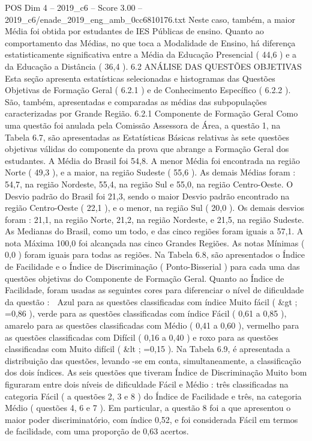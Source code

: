 \begin{textsample}{POS Dim 4 – 2019\_c6 – Score 3.00 – 2019\_c6/enade\_2019\_eng\_amb\_0cc6810176.txt}
Neste caso, também, a maior Média foi obtida por estudantes de IES Públicas de ensino.
Quanto ao comportamento das Médias, no que toca a Modalidade de Ensino, há diferença estatisticamente significativa entre a Média da Educação Presencial ( 44,6 ) e a da Educação a Distância ( 36,4 ). 6.2 ANÁLISE DAS QUESTÕES OBJETIVAS Esta seção apresenta estatísticas selecionadas e histogramas das Questões Objetivas de Formação Geral ( 6.2.1 ) e de Conhecimento Específico ( 6.2.2 ).
São, também, apresentadas e comparadas as médias das subpopulações caracterizadas por Grande Região. 6.2.1 Componente de Formação Geral Como uma questão foi anulada pela Comissão Assessora de Área, a questão 1, na Tabela 6.7, são apresentadas as Estatísticas Básicas relativas às sete questões objetivas válidas do componente da prova que abrange a Formação Geral dos estudantes.
A Média do Brasil foi 54,8.
A menor Média foi encontrada na região Norte ( 49,3 ), e a maior, na região Sudeste ( 55,6 ).
As demais Médias foram : 54,7, na região Nordeste, 55,4, na região Sul e 55,0, na região Centro-Oeste.
O Desvio padrão do Brasil foi 21,3, sendo o maior Desvio padrão encontrado na região Centro-Oeste ( 22,1 ), e o menor, na região Sul ( 20,0 ).
Os demais desvios foram : 21,1, na região Norte, 21,2, na região Nordeste, e 21,5, na região Sudeste.
As Medianas do Brasil, como um todo, e das cinco regiões foram iguais a 57,1.
A nota Máxima 100,0 foi alcançada nas cinco Grandes Regiões.
As notas Mínimas ( 0,0 ) foram iguais para todas as regiões.
Na Tabela 6.8, são apresentados o Índice de Facilidade e o Índice de Discriminação ( Ponto-Bisserial ) para cada uma das questões objetivas do Componente de Formação Geral.
Quanto ao Índice de Facilidade, foram usadas as seguintes cores para diferenciar o nível de dificuldade da questão :  Azul para as questões classificadas com índice Muito fácil ( \&gt ; =0,86 ), verde para as questões classificadas com índice Fácil ( 0,61 a 0,85 ), amarelo para as questões classificadas com Médio ( 0,41 a 0,60 ), vermelho para as questões classificadas com Difícil ( 0,16 a 0,40 ) e roxo para as questões classificadas com Muito difícil ( \&lt ; =0,15 ).
Na Tabela 6.9, é apresentada a distribuição das questões, levando -se em conta, simultaneamente, a classificação dos dois índices.
As seis questões que tiveram Índice de Discriminação Muito bom figuraram entre dois níveis de dificuldade Fácil e Médio : três classificadas na categoria Fácil ( a questões 2, 3 e 8 ) do Índice de Facilidade e três, na categoria Médio ( questões 4, 6 e 7 ).
Em particular, a questão 8 foi a que apresentou o maior poder discriminatório, com índice 0,52, e foi considerada Fácil em termos de facilidade, com uma proporção de 0,63 acertos.

\end{textsample}
